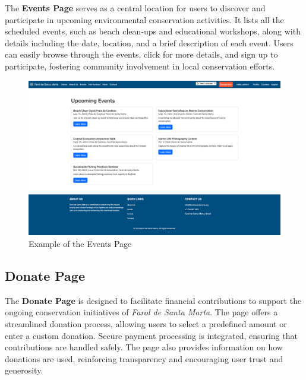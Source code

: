 The \textbf{Events Page} serves as a central location for users to discover and participate in upcoming environmental conservation activities. It lists all the scheduled events, such as beach clean-ups and educational workshops, along with details including the date, location, and a brief description of each event. Users can easily browse through the events, click for more details, and sign up to participate, fostering community involvement in local conservation efforts.

\begin{figure}[H]
    \centering
    \includegraphics[width=\textwidth]{images/events-page.png}
    \caption{Example of the Events Page}
    \label{fig:events_page}
\end{figure}

\subsection{Donate Page}

The \textbf{Donate Page} is designed to facilitate financial contributions to support the ongoing conservation initiatives of \textit{Farol de Santa Marta}. The page offers a streamlined donation process, allowing users to select a predefined amount or enter a custom donation. Secure payment processing is integrated, ensuring that contributions are handled safely. The page also provides information on how donations are used, reinforcing transparency and encouraging user trust and generosity.

